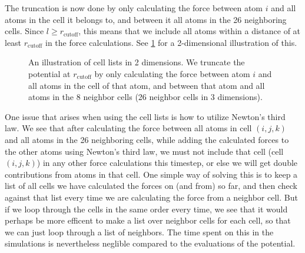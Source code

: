 The truncation is now done by only calculating the force between atom $i$ and all atoms in the cell it belongs to, and between it all atoms in the 26 neighboring cells. Since $l\geq r_\text{cutoff}$, this means that we include all atoms within a distance of at least $r_\text{cutoff}$ in the force calculations. See \cref{fig:cell_lists} for a 2-dimensional illustration of this.
\begin{figure}[htpb]%
    \centering%
    \caption{%
        An illustration of cell lists in 2 dimensions. We truncate the potential at $r_\text{cutoff}$ by only calculating the force between atom $i$ and all atoms in the cell of that atom, and between that atom and all atoms in the 8 neighbor cells (26 neighbor cells in 3 dimensions). %
        \label{fig:cell_lists}%
    }%
\end{figure}%

One issue that arises when using the cell lists is how to utilize Newton's third law. We see that after calculating the force between all atoms in cell $(i,j,k)$ and all atoms in the 26 neighboring cells, while adding the calculated forces to the other atoms using Newton's third law, we must not include that cell (cell $(i,j,k)$) in any other force calculations this timestep, or else we will get double contributions from atoms in that cell. One simple way of solving this is to keep a list of all cells we have calculated the forces on (and from) so far, and then check against that list every time we are calculating the force from a neighbor cell. But if we loop through the cells in the same order every time, we see that it would perhaps be more efficent to make a list over neighbor cells for each cell, so that we can just loop through a list of neighbors. The time spent on this in the simulations is nevertheless neglible compared to the evaluations of the potential.


